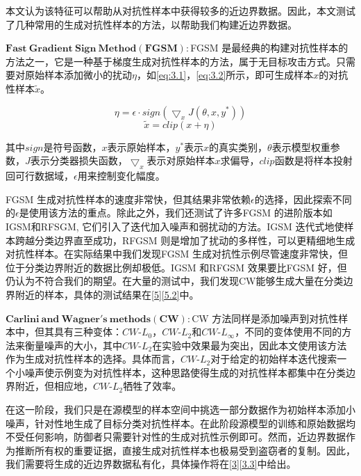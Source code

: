 本文认为该特征可以帮助从对抗性样本中获得较多的近边界数据。因此，本文测试了几种常用的生成对抗性样本的方法，以帮助我们构建近边界数据。

\noindent$\bm{Fast \ Gradient \ Sign \ Method(FGSM):}$FGSM \cite{goodfellow2014explaining}是最经典的构建对抗性样本的方法之一，它是一种基于梯度生成对抗性样本的方法，属于无目标攻击方式。只需要对原始样本添加微小的扰动$\eta$，如\ref{eq:3.1}，\ref{eq:3.2}所示，即可生成样本$x$的对抗性样本$\tilde{x}$。

\begin{equation}
	\label{eq:3.1}
	\eta = \epsilon \cdot sign(\bigtriangledown_xJ(\theta,x,y^*))
\end{equation}
\begin{equation}
	\label{eq:3.2}
	\tilde{x} = clip(x + \eta)
\end{equation}

\noindent 其中$sign$是符号函数，$x$表示原始样本，$y^*$表示$x$的真实类别，$\theta$表示模型权重参数，$J$表示分类器损失函数，$\bigtriangledown_x$表示对原始样本$x$求偏导，$clip$函数是将样本投射回可行数据域，$\epsilon$用来控制变化幅度。

FGSM 生成对抗性样本的速度非常快，但其结果非常依赖$\epsilon$的选择，因此探索不同的$\epsilon$是使用该方法的重点。除此之外，我们还测试了许多FGSM 的进阶版本如IGSM和RFSGM, 它们引入了迭代加入噪声和弱扰动的方法。IGSM 迭代式地使样本跨越分类边界直至成功，RFGSM 则是增加了扰动的多样性，可以更精细地生成对抗性样本。在实际结果中我们发现FGSM 生成对抗性示例尽管速度非常快，但位于分类边界附近的数据比例却极低。IGSM 和RFGSM 效果要比FGSM 好，但仍认为不符合我们的期望。在大量的测试中，我们发现CW能够生成大量在分类边界附近的样本，具体的测试结果在\ref{5}\ref{5.2}中。

\noindent$\bm{Carlini \ and \ Wagner's \ methods(CW):}$CW \cite{carlini2017towards}方法同样是添加噪声到对抗性样本中，但其具有三种变体：$CW$-$L_0$，$CW$-$L_2$和$CW$-$L_{\infty}$，不同的变体使用不同的方法来衡量噪声的大小，其中$CW$-$L_2$在实验中效果最为突出，因此本文使用该方法作为生成对抗性样本的选择。具体而言，$CW$-$L_2$对于给定的初始样本迭代搜索一个小噪声使示例变为对抗性样本，这种思路使得生成的对抗性样本都集中在分类边界附近，但相应地，$CW$-$L_2$牺牲了效率。

在这一阶段，我们只是在源模型的样本空间中挑选一部分数据作为初始样本添加小噪声，针对性地生成了目标分类对抗性样本。在此阶段源模型的训练和原始数据均不受任何影响，防御者只需要针对性的生成对抗性示例即可。然而，近边界数据作为推断所有权的重要证据，直接生成对抗性样本也极易受到盗窃者的复制。因此，我们需要将生成的近边界数据私有化，具体操作将在\ref{3}\ref{3.3}中给出。

